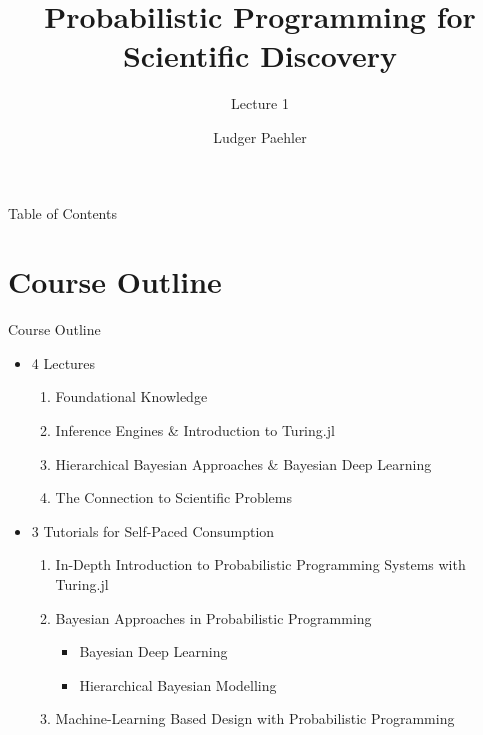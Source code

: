 \documentclass[AERbeamer%
              ,optEnglish%
              ,optBiber%
              ,optBibstyleAlphabetic%
              ,optBeamerClassicFormat%
              ]{AERlatex}%
\title{Probabilistic Programming for Scientific Discovery}%
\subtitle{Lecture 1}
\author{Ludger Paehler}%
\date{\AERutilsDate{29}{7}{2020}}%
\institute{Lviv Data Science Summer School}%
\begin{document}
%
%
\AERbeamerTitlePageDefault%
%
%

\begin{frame}{Table of Contents}{}%
    \tableofcontents
\end{frame}%


\section{Course Outline}

\begin{frame}[c]{Course Outline}
    \centering
    \begin{itemize}
        \item 4 Lectures
        \begin{enumerate}
            \item Foundational Knowledge
            \item Inference Engines \& Introduction to Turing.jl
            \item Hierarchical Bayesian Approaches \& Bayesian Deep Learning
            \item The Connection to Scientific Problems
        \end{enumerate}
        \item 3 Tutorials for Self-Paced Consumption
        \begin{enumerate}
            \item In-Depth Introduction to Probabilistic Programming Systems with Turing.jl
            \item Bayesian Approaches in Probabilistic Programming
            \begin{itemize}
                \item Bayesian Deep Learning
                \item Hierarchical Bayesian Modelling
            \end{itemize}
            \item Machine-Learning Based Design with Probabilistic Programming
        \end{enumerate}
    \end{itemize}
\end{frame}
\end{document}

